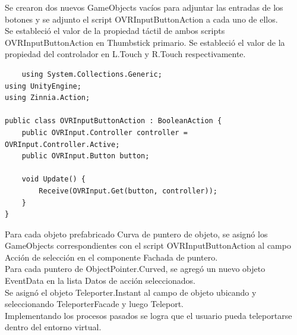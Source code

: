 Se crearon dos nuevos GameObjects vacíos  para adjuntar las entradas de los botones y se adjunto el script OVRInputButtonAction a cada uno de ellos.\\

Se estableció el valor de la propiedad táctil de ambos scripts OVRInputButtonAction en Thumbstick primario. Se estableció el valor de la propiedad del controlador en L.Touch y R.Touch respectivamente.\\

\begin{verbatim}
    using System.Collections.Generic;
using UnityEngine;
using Zinnia.Action;
 
public class OVRInputButtonAction : BooleanAction {
    public OVRInput.Controller controller = OVRInput.Controller.Active;
    public OVRInput.Button button;
 
    void Update() {
        Receive(OVRInput.Get(button, controller));
    }
}
\end{verbatim}

Para cada objeto prefabricado Curva de puntero de objeto, se asignó los GameObjects correspondientes con el script OVRInputButtonAction al campo Acción de selección en el componente Fachada de puntero.\\

Para cada puntero de ObjectPointer.Curved, se agregó un nuevo objeto EventData en la lista Datos de acción seleccionados.\\

Se asignó el objeto Teleporter.Instant al campo de objeto ubicando y seleccionando TeleporterFacade y luego Teleport.\\

Implementando los procesos pasados se logra que el usuario pueda teleportarse dentro del  entorno virtual.\\


